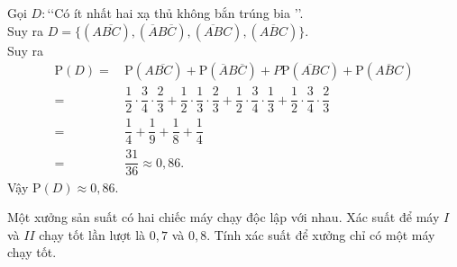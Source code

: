 \begin{ex}
{\begin{center}
	\end{center}
		Gọi $D:$\lq\lq Có ít nhất hai xạ thủ không bắn trúng bia \rq\rq.\\
		Suy ra $D=\{(A\overline{BC}), (\overline{A}B\overline{C}), (\overline{AB}C), (\overline{ABC})\}$.\\
		Suy ra 
		\begin{align*}
			\mathrm{P}(D)=&\, \mathrm{P}(A\overline{BC})+\mathrm{P}(\overline{A}B\overline{C})+P\mathrm{P}(\overline{AB}C)+\mathrm{P}(\overline{ABC})\\
			=&\, \dfrac{1}{2}\cdot\dfrac{3}{4}\cdot\dfrac{2}{3}+\dfrac{1}{2}\cdot\dfrac{1}{3}\cdot\dfrac{2}{3}+\dfrac{1}{2}\cdot\dfrac{3}{4}\cdot\dfrac{1}{3}+\dfrac{1}{2}\cdot\dfrac{3}{4}\cdot\dfrac{2}{3}\\
			=&\, \dfrac{1}{4}+\dfrac{1}{9}+\dfrac{1}{8}+\dfrac{1}{4}\\
			=&\, \dfrac{31}{36}\approx 0{,}86.
		\end{align*}
		Vậy $\mathrm{P}(D)\approx 0{,}86$.
	}
\end{ex}

\begin{vd}%
	Một xưởng sản suất có hai chiếc máy chạy độc lập với nhau. Xác suất để máy $I$ và $II$ chạy tốt lần lượt là $0{,}7$ và $0{,}8$. Tính xác suất để xưởng chỉ có một máy chạy tốt.
\end{vd}

